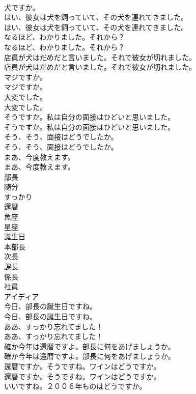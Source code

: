 \documentclass[8pt]{extreport}
\begin{document}
\begin{CJK}{UTF8}{min}
\\	犬ですか。 
\\	はい、彼女は犬を飼っていて、その犬を連れてきました。	
\\	はい、彼女は犬を飼っていて、その犬を連れてきました。 
\\	なるほど、わかりました。それから？	
\\	なるほど、わかりました。それから？ 
\\	店員が犬はだめだと言いました。それで彼女が切れました。	
\\	店員が犬はだめだと言いました。それで彼女が切れました。 
\\	マジですか。	
\\	マジですか。 
\\	大変でした。	
\\	大変でした。 
\\	そうですか。私は自分の面接はひどいと思いました。	
\\	そうですか。私は自分の面接はひどいと思いました。 
\\	そう、そう、面接はどうでしたか。	
\\	そう、そう、面接はどうでしたか。 
\\	まあ、今度教えます。	
\\	まあ、今度教えます。 
\\	部長
\\	随分
\\	すっかり
\\	還暦
\\	魚座
\\	星座
\\	誕生日
\\	本部長
\\	次長
\\	課長
\\	係長
\\	社員
\\	アイディア
\\	今日、部長の誕生日ですね。	
\\	今日、部長の誕生日ですね。 
\\	ああ、すっかり忘れてました！	
\\	ああ、すっかり忘れてました！ 
\\	確か今年は還暦ですよ。部長に何をあげましょうか。	
\\	確か今年は還暦ですよ。部長に何をあげましょうか。 
\\	還暦ですか。そうですね。ワインはどうですか。	
\\	還暦ですか。そうですね。ワインはどうですか。 
\\	いいですね。２００６年ものはどうですか。	

\end{CJK}
\end{document}
